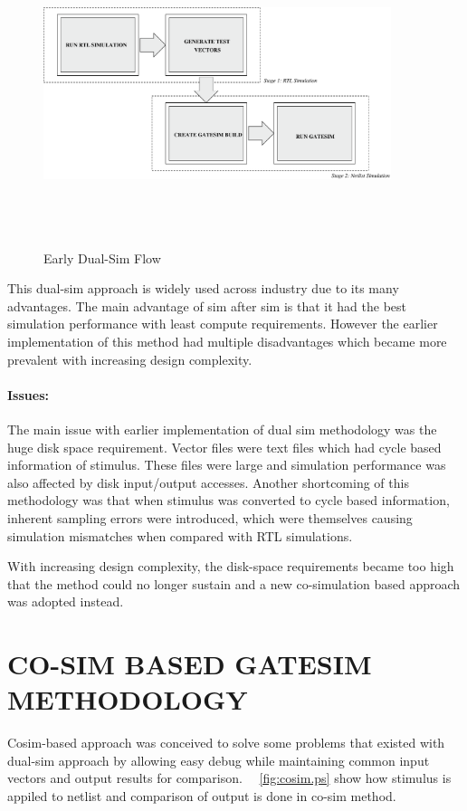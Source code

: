 \begin{figure}[H]
\centering
\includegraphics[width=4in, height=3.5in]{./figures/earlydualsim.eps}
\caption{Early Dual-Sim Flow}
\label{fig:earlydualsim.eps}
\end{figure}

This dual-sim approach is widely used across industry due to its many advantages. The main advantage of sim after sim is that it had the best simulation performance with least compute requirements. However the earlier implementation of this method had multiple disadvantages which became more prevalent with increasing design complexity.

\paragraph{Issues:}The main issue with earlier implementation of dual sim methodology was the huge disk space requirement. Vector files were text files which had cycle based information of stimulus. These files were large and simulation performance was also affected by disk input/output accesses. Another shortcoming of this methodology was that when stimulus was converted to cycle based information, inherent sampling errors were introduced, which were themselves causing simulation mismatches when compared with RTL simulations.

 
 With increasing design complexity, the disk-space requirements became too high that the method could no longer sustain and a new co-simulation based approach was adopted instead.





\section{CO-SIM BASED GATESIM METHODOLOGY}
 Cosim-based approach was conceived to solve some problems that existed with dual-sim approach by allowing easy debug while maintaining common input vectors and output results for comparison.  ~\figurename{~\ref{fig:cosim.ps}} show how stimulus is appiled to netlist and comparison of output is done in co-sim method.
 
